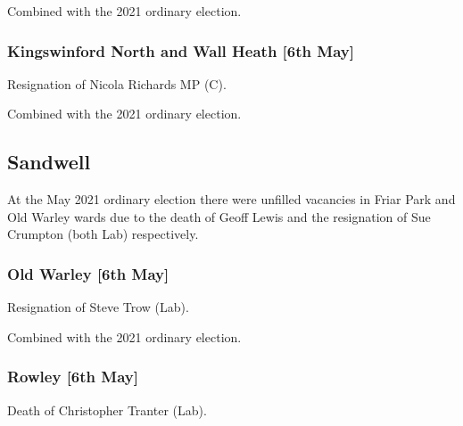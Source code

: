 \documentclass[a4paper,openany]{book}
\begin{document}
\begin{resultsiii}
Combined with the 2021 ordinary election.

\subsubsection*{Kingswinford North and Wall Heath \hspace*{\fill}\nolinebreak[1]%
	\enspace\hspace*{\fill}
	[6th May]}


Resignation of Nicola Richards MP (C).

Combined with the 2021 ordinary election.

\subsection*{Sandwell}

At the May 2021 ordinary election there were unfilled vacancies in Friar Park and Old Warley wards due to the death of Geoff Lewis and the resignation of Sue Crumpton (both Lab) respectively.

\subsubsection*{Old Warley \hspace*{\fill}\nolinebreak[1]%
	\enspace\hspace*{\fill}
	[6th May]}


Resignation of Steve Trow (Lab).

Combined with the 2021 ordinary election.

\subsubsection*{Rowley \hspace*{\fill}\nolinebreak[1]%
	\enspace\hspace*{\fill}
	[6th May]}


Death of Christopher Tranter (Lab).


\end{resultsiii}
\end{document}
